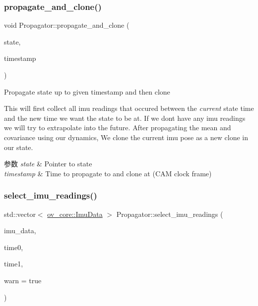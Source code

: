 \subsubsection{\texorpdfstring{propagate\+\_\+and\+\_\+clone()}{propagate\_and\_clone()}}
{\footnotesize\ttfamily void Propagator\+::propagate\+\_\+and\+\_\+clone (\begin{DoxyParamCaption}\item[{std\+::shared\+\_\+ptr$<$ \hyperlink{classov__msckf_1_1State}{State} $>$}]{state,  }\item[{double}]{timestamp }\end{DoxyParamCaption})}



Propagate state up to given timestamp and then clone 

This will first collect all imu readings that occured between the {\itshape current} state time and the new time we want the state to be at. If we don\textquotesingle{}t have any imu readings we will try to extrapolate into the future. After propagating the mean and covariance using our dynamics, We clone the current imu pose as a new clone in our state.


\begin{DoxyParams}{参数}
{\em state} & Pointer to state \\
\hline
{\em timestamp} & Time to propagate to and clone at (C\+AM clock frame) \\
\hline
\end{DoxyParams}
\mbox{\label{classov__msckf_1_1Propagator_a2f2d18be72bfc40bab5ae5eab2bae10e}} 
\subsubsection{\texorpdfstring{select\+\_\+imu\+\_\+readings()}{select\_imu\_readings()}}
{\footnotesize\ttfamily std\+::vector$<$ \hyperlink{structov__core_1_1ImuData}{ov\+\_\+core\+::\+Imu\+Data} $>$ Propagator\+::select\+\_\+imu\+\_\+readings (\begin{DoxyParamCaption}\item[{const std\+::vector$<$ \hyperlink{structov__core_1_1ImuData}{ov\+\_\+core\+::\+Imu\+Data} $>$ \&}]{imu\+\_\+data,  }\item[{double}]{time0,  }\item[{double}]{time1,  }\item[{bool}]{warn = {\ttfamily true} }\end{DoxyParamCaption})\hspace{0.3cm}{\ttfamily [static]}}



